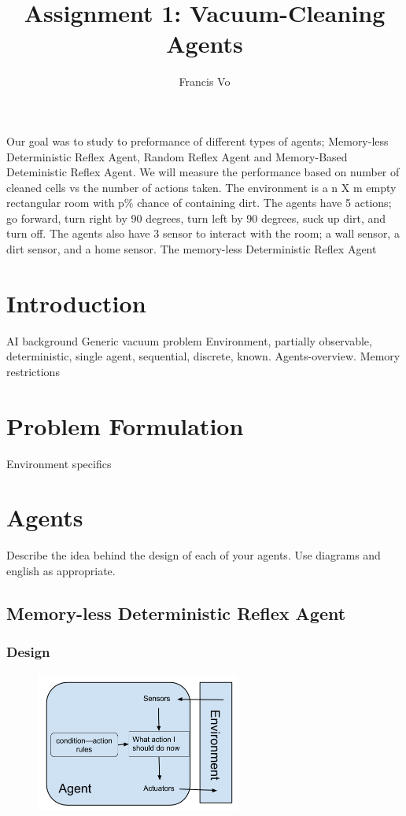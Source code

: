 \documentclass[a4paper,10pt]{article}
\title{Assignment 1: Vacuum-Cleaning Agents}
\author{Francis Vo}
\begin{document}
\maketitle
Our goal was to study to preformance of different types of agents; Memory-less Deterministic Reflex Agent, Random Reflex Agent and Memory-Based Deteministic Reflex Agent.
We will measure the performance based on number of cleaned cells vs the number of actions taken.
The environment is a n X m empty rectangular room with p\% chance of containing dirt.
The agents have 5 actions; go forward, turn right by 90 degrees, turn left by 90 degrees, suck up dirt, and turn off.
The agents also have 3 sensor to interact with the room; a wall sensor, a dirt sensor, and a home sensor.
The memory-less Deterministic Reflex Agent

\section{Introduction}
AI background
Generic vacuum problem
Environment, partially observable, deterministic, single agent, sequential, discrete, known.
Agents-overview. Memory restrictions




\section{Problem Formulation}
Environment specifics

\section{Agents}
Describe the idea behind the design of each of your agents. Use diagrams and english as appropriate.
\subsection{Memory-less Deterministic Reflex Agent}
\subsubsection{Design}
\begin{figure}[H]
	\begin{center}
		\includegraphics[width=0.6\textwidth]{MemorylessReflex.png}
	\end{center}
\end{figure}
\end{document}
